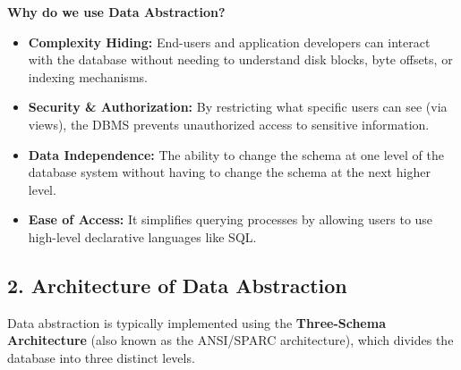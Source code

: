 \documentclass[12pt,a3paper]{article}
\begin{document}
\begin{enumerate}
\begin{tcolorbox}[enhanced,breakable,ansbox,colback=cA!4,colframe=cA,boxrule=0.8pt,arc=5pt,title={\textbf{Answer}},fonttitle=\bfseries\color{white},colbacktitle=cA]
\textbf{Why do we use Data Abstraction?}
\begin{itemize}
    \item \textbf{Complexity Hiding:} End-users and application developers can interact with the database without needing to understand disk blocks, byte offsets, or indexing mechanisms.
    \item \textbf{Security \& Authorization:} By restricting what specific users can see (via views), the DBMS prevents unauthorized access to sensitive information.
    \item \textbf{Data Independence:} The ability to change the schema at one level of the database system without having to change the schema at the next higher level.
    \item \textbf{Ease of Access:} It simplifies querying processes by allowing users to use high-level declarative languages like SQL.
\end{itemize}

\vspace{1em}
\subsection*{2. Architecture of Data Abstraction}

Data abstraction is typically implemented using the \textbf{Three-Schema Architecture} (also known as the ANSI/SPARC architecture), which divides the database into three distinct levels.

\vspace{1em}
\begin{center}
\end{center}
\end{tcolorbox}
\end{enumerate}
\end{document}
